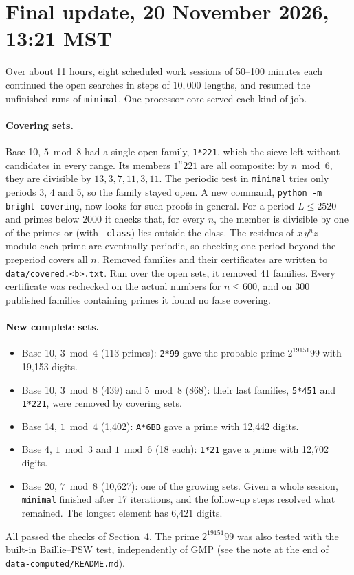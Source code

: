 \documentclass[11pt]{article}
\newcommand{\code}[1]{\texttt{#1}}
\begin{document}
\section{Final update, 20 November 2026, 13:21 MST}\label{sec:final}

Over about 11 hours, eight scheduled work sessions of 50--100 minutes each continued the open searches in steps of $10{,}000$ lengths, and resumed the unfinished runs of \code{minimal}. One processor core served each kind of job.

\paragraph{Covering sets.} Base 10, $5 \bmod 8$ had a single open family, \code{1*221}, which the sieve left without candidates in every range. Its members $1^n221$ are all composite: by $n \bmod 6$, they are divisible by $13, 3, 7, 11, 3, 11$. The periodic test in \code{minimal} tries only periods 3, 4 and 5, so the family stayed open. A new command, \code{python -m bright covering}, now looks for such proofs in general. For a period $L\le 2520$ and primes below $2000$ it checks that, for every $n$, the member is divisible by one of the primes or (with \code{--class}) lies outside the class. The residues of $x\,y^n z$ modulo each prime are eventually periodic, so checking one period beyond the preperiod covers all $n$. Removed families and their certificates are written to \code{data/covered.<b>.txt}. Run over the open sets, it removed 41 families. Every certificate was rechecked on the actual numbers for $n\le 600$, and on 300 published families containing primes it found no false covering.

\paragraph{New complete sets.}
\begin{itemize}
\item Base 10, $3 \bmod 4$ (113 primes): \code{2*99} gave the probable prime $2^{19151}99$ with 19{,}153 digits.
\item Base 10, $3 \bmod 8$ (439) and $5 \bmod 8$ (868): their last families, \code{5*451} and \code{1*221}, were removed by covering sets.
\item Base 14, $1 \bmod 4$ (1{,}402): \code{A*6BB} gave a prime with 12{,}442 digits.
\item Base 4, $1 \bmod 3$ and $1 \bmod 6$ (18 each): \code{1*21} gave a prime with 12{,}702 digits.
\item Base 20, $7 \bmod 8$ (10{,}627): one of the growing sets. Given a whole session, \code{minimal} finished after 17 iterations, and the follow-up steps resolved what remained. The longest element has 6{,}421 digits.
\end{itemize}
All passed the checks of Section~4. The prime $2^{19151}99$ was also tested with the built-in Baillie--PSW test, independently of GMP (see the note at the end of \code{data-computed/README.md}).
\end{document}
